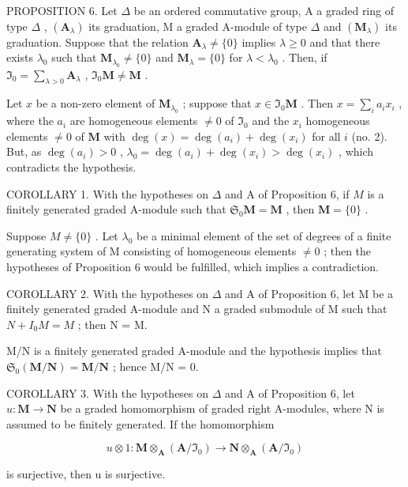 PROPOSITION 6. Let \(\Delta\) be an ordered commutative group, A a graded ring of type \(\Delta\) , \((\mathbf{A}_{\lambda})\) its graduation, M a graded A-module of type \(\Delta\) and \((\mathbf{M}_{\lambda})\) its graduation. Suppose that the relation \(\mathbf{A}_{\lambda} \neq \{0\}\) implies \(\lambda \geqslant 0\) and that there exists \(\lambda_0\) such that \(\mathbf{M}_{\lambda_0} \neq \{0\}\) and \(\mathbf{M}_{\lambda} = \{0\}\) for \(\lambda < \lambda_0\) . Then, if \(\Im_0 = \sum_{\lambda > 0} \mathbf{A}_{\lambda}\) , \(\Im_0 \mathbf{M} \neq \mathbf{M}\) .

Let \(x\) be a non-zero element of \(\mathbf{M}_{\lambda_0}\) ; suppose that \(x \in \mathfrak{I}_0\mathbf{M}\) . Then \(x = \sum_{i} a_i x_i\) , where the \(a_i\) are homogeneous elements \(\neq 0\) of \(\mathfrak{I}_0\) and the \(x_i\) homogeneous elements \(\neq 0\) of \(\mathbf{M}\) with \(\deg(x) = \deg(a_i) + \deg(x_i)\) for all \(i\) (no. 2). But, as \(\deg(a_i) > 0\) , \(\lambda_0 = \deg(a_i) + \deg(x_i) > \deg(x_i)\) , which contradicts the hypothesis.

COROLLARY 1. With the hypotheses on \(\Delta\) and A of Proposition 6, if \(M\) is a finitely generated graded A-module such that \(\mathfrak{S}_0\mathbf{M} = \mathbf{M}\) , then \(\mathbf{M} = \{0\}\) .

Suppose \(M \neq \{0\}\) . Let \(\lambda_{0}\) be a minimal element of the set of degrees of a finite generating system of M consisting of homogeneous elements \(\neq0\) ; then the hypotheses of Proposition 6 would be fulfilled, which implies a contradiction.

COROLLARY 2. With the hypotheses on \(\Delta\) and A of Proposition 6, let M be a finitely generated graded A-module and N a graded submodule of M such that \(N + I_{0}M = M\) ; then N = M.

M/N is a finitely generated graded A-module and the hypothesis implies that \(\mathfrak{S}_{0}(\mathbf{M}/\mathbf{N}) = \mathbf{M}/\mathbf{N}\) ; hence M/N = 0.

COROLLARY 3. With the hypotheses on \(\Delta\) and A of Proposition 6, let \(u: \mathbf{M} \to \mathbf{N}\) be a graded homomorphism of graded right A-modules, where N is assumed to be finitely generated. If the homomorphism

\[
u \otimes 1: \mathbf {M} \otimes_ {\mathbf {A}} (\mathbf {A} / \mathfrak {I} _ {0}) \rightarrow \mathbf {N} \otimes_ {\mathbf {A}} (\mathbf {A} / \mathfrak {I} _ {0})
\]

is surjective, then u is surjective.

